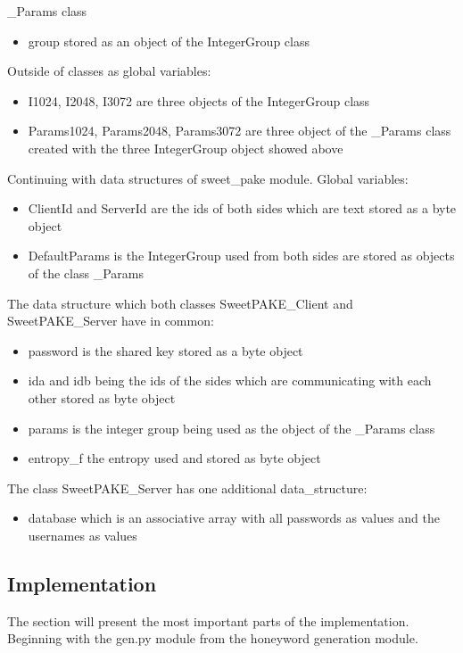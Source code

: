 \documentclass[../main.tex]{subfiles}
\begin{document}
\_Params class
\begin{itemize}
	\item group stored as an object of the IntegerGroup class
\end{itemize}

Outside of classes as global variables:
\begin{itemize}
	\item I1024, I2048, I3072 are three objects of the IntegerGroup class
	\item Params1024, Params2048, Params3072 are three object of the
		\_Params class created with the three IntegerGroup object
		showed above
\end{itemize}

Continuing with data structures of sweet\_pake module. Global variables:
\begin{itemize}
	\item ClientId and ServerId are the ids of both sides which are text
	stored as a byte object 
  	\item DefaultParams is the IntegerGroup used from
		both sides are stored as objects of the class \_Params
\end{itemize}

The data structure which both classes SweetPAKE\_Client and SweetPAKE\_Server have in common:
\begin{itemize}
	\item password is the shared key stored as a byte object 
	\item ida and idb being the ids of the sides which are communicating
		with each other stored as byte object
	\item params is the integer group being used as the object of the \_Params class
	\item entropy\_f the entropy used and stored as byte object
\end{itemize}

The class SweetPAKE\_Server has one additional data\_structure:
\begin{itemize} 
 	\item database which is an associative array with all passwords as
			values and the usernames as values
\end{itemize}

\subsection{Implementation}

The section will present the most important parts of the implementation.
Beginning with the gen.py module from the honeyword generation module. 
\end{document}
